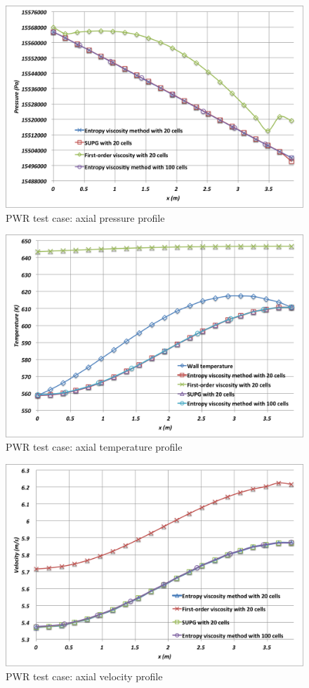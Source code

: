 \documentclass[12pt]{article}
\begin{document}
\begin{figure}[h]
\centering
\includegraphics[scale=0.4]{plots/Pressure.png}
\caption{PWR test case: axial pressure profile}
\label{fig:Pressure}
\end{figure}
\begin{figure}[h]
\centering
\includegraphics[scale=0.4]{plots/Temperature.png}
\caption{PWR test case: axial temperature profile}
\label{fig:Temperature}
\end{figure}
\begin{figure}[h]
\centering
\includegraphics[scale=0.4]{plots/Velocity.png}
\caption{PWR test case: axial velocity profile}
\label{fig:Velocity}
\end{figure}
\end{document}
